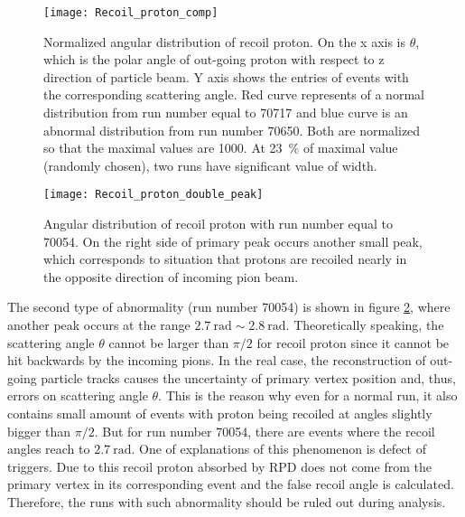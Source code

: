 \begin{figure}[!b]
	\centering
	\texttt{[image: Recoil\_proton\_comp]}
	\caption{Normalized angular distribution of recoil proton. On the x axis is $\theta$, which is the polar angle of out-going proton with respect to z direction of particle beam. Y axis shows the entries of events with the corresponding scattering angle. Red curve represents of a normal distribution from run number equal to 70717 and blue curve is an abnormal distribution from run number 70650. Both are normalized so that the maximal values are 1000. At \SI{23}{\percent} of maximal value (randomly chosen), two runs have significant value of width. }
	\label{fig:Recoil_proton_comp}
\end{figure}

\begin{figure}[!b]
	\centering
	\texttt{[image: Recoil\_proton\_double\_peak]}
	\caption{Angular distribution of recoil proton with run number equal to 70054. On the right side of primary peak occurs another small peak, which corresponds to situation that protons are recoiled nearly in the opposite direction of incoming pion beam. }
	\label{fig:Recoil_proton_double_peak}
\end{figure}


The second type of abnormality (run number 70054) is shown in figure \ref{fig:Recoil_proton_double_peak}, where another peak occurs at the range $\SI{2.7}{\radian} \sim \SI{2.8}{\radian}$. Theoretically speaking, the scattering angle $\theta$ cannot be larger than $\pi/2$ for recoil proton since it cannot be hit backwards by the incoming pions. In the real case, the reconstruction of out-going particle tracks causes the uncertainty of primary vertex position and, thus, errors on scattering angle $\theta$. This is the reason why even for a normal run, it also contains small amount of events with proton being recoiled at angles slightly bigger than $\pi/2$. But for run number 70054, there are events where the recoil angles reach to $\SI{2.7}{\radian}$. One of explanations of this phenomenon is defect of triggers. Due to this recoil proton absorbed by RPD does not come from the primary vertex in its corresponding event and the false recoil angle is calculated. Therefore, the runs with such abnormality should be ruled out during analysis.




